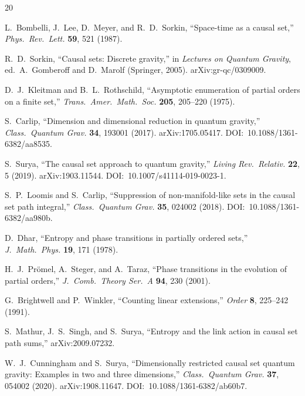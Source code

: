 \documentclass[11pt,a4paper]{article}
\begin{document}
\begin{thebibliography}{20}

L.~Bombelli, J.~Lee, D.~Meyer, and R.~D.~Sorkin,
``Space-time as a causal set,''
\textit{Phys.\ Rev.\ Lett.} \textbf{59}, 521 (1987).

R.~D.~Sorkin,
``Causal sets: Discrete gravity,''
in \textit{Lectures on Quantum Gravity}, ed.\ A.~Gomberoff and D.~Marolf
(Springer, 2005). arXiv:gr-qc/0309009.

D.~J.~Kleitman and B.~L.~Rothschild,
``Asymptotic enumeration of partial orders on a finite set,''
\textit{Trans.\ Amer.\ Math.\ Soc.} \textbf{205}, 205--220 (1975).

S.~Carlip,
``Dimension and dimensional reduction in quantum gravity,''
\textit{Class.\ Quantum Grav.} \textbf{34}, 193001 (2017).
arXiv:1705.05417. DOI:~10.1088/1361-6382/aa8535.

S.~Surya,
``The causal set approach to quantum gravity,''
\textit{Living Rev.\ Relativ.} \textbf{22}, 5 (2019).
arXiv:1903.11544. DOI:~10.1007/s41114-019-0023-1.

S.~P.~Loomis and S.~Carlip,
``Suppression of non-manifold-like sets in the causal set path integral,''
\textit{Class.\ Quantum Grav.} \textbf{35}, 024002 (2018).
DOI:~10.1088/1361-6382/aa980b.

D.~Dhar,
``Entropy and phase transitions in partially ordered sets,''
\textit{J.\ Math.\ Phys.} \textbf{19}, 171 (1978).

H.~J.~Pr{\"o}mel, A.~Steger, and A.~Taraz,
``Phase transitions in the evolution of partial orders,''
\textit{J.\ Comb.\ Theory Ser.\ A} \textbf{94}, 230 (2001).

G.~Brightwell and P.~Winkler,
``Counting linear extensions,''
\textit{Order} \textbf{8}, 225--242 (1991).

S.~Mathur, J.~S.~Singh, and S.~Surya,
``Entropy and the link action in causal set path sums,''
arXiv:2009.07232.

W.~J.~Cunningham and S.~Surya,
``Dimensionally restricted causal set quantum gravity: Examples in two and three dimensions,''
\textit{Class.\ Quantum Grav.} \textbf{37}, 054002 (2020).
arXiv:1908.11647. DOI:~10.1088/1361-6382/ab60b7.


\end{thebibliography}
\end{document}
